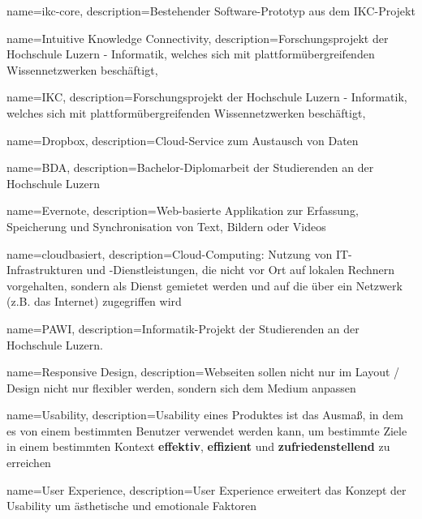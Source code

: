 \usepackage[acronym,noredefwarn]{glossaries}
\makenoidxglossaries

{
    name=ikc-core,
    description={Bestehender Software-Prototyp aus dem IKC-Projekt}
}

{
    name=Intuitive Knowledge Connectivity,
    description={Forschungsprojekt der Hochschule Luzern - Informatik, welches sich mit plattformübergreifenden Wissennetzwerken beschäftigt},
}

{
    name=IKC,
    description={Forschungsprojekt der Hochschule Luzern - Informatik, welches sich mit plattformübergreifenden Wissennetzwerken beschäftigt},
}


{
    name=Dropbox,
    description={Cloud-Service zum Austausch von Daten}
    \cite{dropbox}
}

{
    name=BDA,
    description={Bachelor-Diplomarbeit der Studierenden an der Hochschule Luzern}
}


{
    name=Evernote,
    description={Web-basierte Applikation zur Erfassung, Speicherung und Synchronisation von Text, Bildern oder Videos}
    \cite{evernote}
}

{
    name=cloudbasiert,
    description={Cloud-Computing: Nutzung von IT-Infrastrukturen und -Dienstleistungen, die nicht vor Ort auf lokalen Rechnern vorgehalten, sondern als Dienst gemietet werden und auf die über ein Netzwerk (z.B. das Internet) zugegriffen wird} \cite{duden.de}
}

{
    name=PAWI,
    description={Informatik-Projekt der Studierenden an der Hochschule Luzern.}
}

{
    name=Responsive Design,
    description={Webseiten sollen nicht nur im Layout / Design nicht nur flexibler werden, sondern sich dem Medium anpassen}
    \cite[S.8]{responsive-webdesign}
}

{
    name=Usability,
    description={Usability eines Produktes ist das Ausmaß, in dem es von einem bestimmten Benutzer verwendet werden kann, um bestimmte Ziele in einem bestimmten Kontext \textbf{effektiv}, \textbf{effizient} und \textbf{zufriedenstellend} zu erreichen}
    \cite{usab}
}

{
    name=User Experience,
    description={User Experience erweitert das Konzept der \gls{Usability} um ästhetische und emotionale Faktoren}
    \cite{ux}
}


